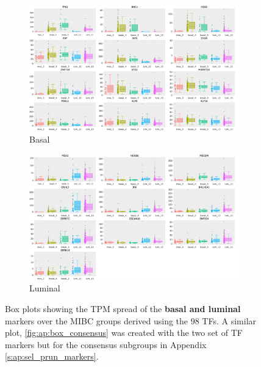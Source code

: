 \begin{figure}[H]
    \centering
    \begin{subfigure}[!t]{1.0\textwidth}
        \includegraphics[width=1.0\textwidth,height=1.0\textheight,keepaspectratio]{Sections/Network_I/Resources/selective_pruning/box_plots/dendrogram_basal.png}
        \caption{Basal}
        \label{fig:N_I:box_basal_dendrogram}
    \end{subfigure}
    \begin{subfigure}[!t]{1.0\textwidth}
      \includegraphics[width=1.0\textwidth,height=1.0\textheight,keepaspectratio]{Sections/Network_I/Resources/selective_pruning/box_plots/dendrogram_lum.png}
      \caption{Luminal}
      \label{fig:N_I:box_luminal_dendrogram}
    \end{subfigure}
    \caption[98 TFs: expression of basal and luminal markers in the new groups]{Box plots showing the TPM spread of the \textbf{basal and luminal} markers over the MIBC groups derived using the 98 TFs. A similar plot, \cref{fig:ap:box_consensus} was created with the two set of TF markers but for the consensus \citep{Kamoun2020-tj} subgroups in Appendix \cref{s:ap:sel_prun_markers}.}
    \label{fig:N_I:box_debdrogram}
\end{figure}



